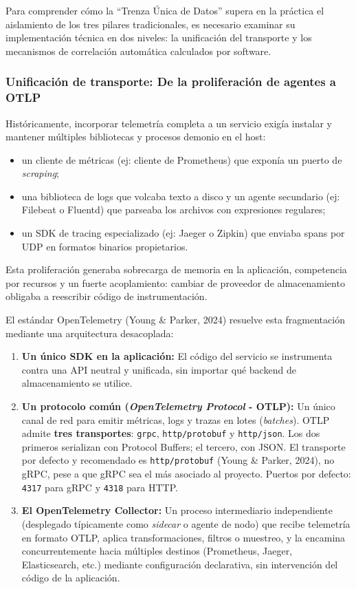 \documentclass[variant=apuntes,cover=institutional,mode=screen]{ua-engineering-v6-article}
\begin{document}
Para comprender cómo la ``Trenza Única de Datos'' supera en la práctica el aislamiento de los tres pilares tradicionales, es necesario examinar su implementación técnica en dos niveles: la unificación del transporte y los mecanismos de correlación automática calculados por software.

\subsubsection{Unificación de transporte: De la proliferación de agentes a OTLP}

Históricamente, incorporar telemetría completa a un servicio exigía instalar y mantener múltiples bibliotecas y procesos demonio en el host:
\begin{itemize}
\item un cliente de métricas (ej: cliente de Prometheus) que exponía un puerto de \emph{scraping};
\item una biblioteca de logs que volcaba texto a disco y un agente secundario (ej: Filebeat o Fluentd) que parseaba los archivos con expresiones regulares;
\item un SDK de tracing especializado (ej: Jaeger o Zipkin) que enviaba spans por UDP en formatos binarios propietarios.
\end{itemize}

Esta proliferación generaba sobrecarga de memoria en la aplicación, competencia por recursos y un fuerte acoplamiento: cambiar de proveedor de almacenamiento obligaba a reescribir código de instrumentación.

El estándar OpenTelemetry (Young \& Parker, 2024) resuelve esta fragmentación mediante una arquitectura desacoplada:
\begin{enumerate}
\item \textbf{Un único SDK en la aplicación:} El código del servicio se instrumenta contra una API neutral y unificada, sin importar qué backend de almacenamiento se utilice.
\item \textbf{Un protocolo común (\emph{OpenTelemetry Protocol} - OTLP):} Un único canal de red para emitir métricas, logs y trazas en lotes (\emph{batches}). OTLP admite \textbf{tres transportes}: \texttt{grpc}, \texttt{http/protobuf} y \texttt{http/json}. Los dos primeros serializan con Protocol Buffers; el tercero, con JSON. El transporte por defecto y recomendado es \texttt{http/protobuf} (Young \& Parker, 2024), no gRPC, pese a que gRPC sea el más asociado al proyecto. Puertos por defecto: \texttt{4317} para gRPC y \texttt{4318} para HTTP.
\item \textbf{El OpenTelemetry Collector:} Un proceso intermediario independiente (desplegado típicamente como \emph{sidecar} o agente de nodo) que recibe telemetría en formato OTLP, aplica transformaciones, filtros o muestreo, y la encamina concurrentemente hacia múltiples destinos (Prometheus, Jaeger, Elasticsearch, etc.) mediante configuración declarativa, sin intervención del código de la aplicación.
\end{enumerate}
\end{document}
